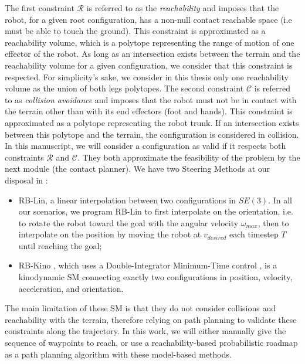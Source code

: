 The first constraint $\mathcal{R}$ is referred to as the \textit{reachability} and imposes that the robot, for a given root configuration, has a non-null contact reachable space (i.e must be able to touch the ground). 
This constraint is approximated as a reachability volume, which is a polytope representing the range of motion of one effector of the robot.
As long as an intersection exists between the terrain and the reachability volume for a given configuration, we consider that this constraint is respected.
For simplicity's sake, we consider in this thesis only one reachability volume as the union of both legs polytopes.
The second constraint $\mathcal{C}$ is referred to as \textit{collision avoidance} and imposes that the robot must not be in contact with the terrain other than with its end effectors (foot and hands). This constraint is approximated as a polytope representing the robot trunk. If an intersection exists between this polytope and the terrain, the configuration is considered in collision.
In this manuscript, we will consider a configuration as valid if it respects both constraints $\mathcal{R}$ and $\mathcal{C}$. They both approximate the feasibility of the problem by the next module (the contact planner).
We have two Steering Methods at our disposal in \cite{loco3d}:
\begin{itemize}
    \item RB-Lin, a linear interpolation between two configurations in $SE(3)$. In all our scenarios, we program RB-Lin to first interpolate on the orientation, i.e. to rotate the robot toward the goal with the angular velocity $\omega_{max}$, then to interpolate on the position by moving the robot at $v_{desired}$ each timestep $T$ until reaching the goal;
    \item RB-Kino \cite{kinodynamic_sm_2017}, which uses a Double-Integrator Minimum-Time control \cite{DIMT}, is a kinodynamic SM connecting exactly two configurations in position, velocity, acceleration, and orientation.
\end{itemize}
The main limitation of these SM is that they do not consider collisions and reachability with the terrain, therefore relying on path planning to validate these constraints along the trajectory.
In this work, we will either manually give the sequence of waypoints to reach, or use a reachability-based probabilistic roadmap \cite{RB-PRM} as a path planning algorithm with these model-based methods. 

